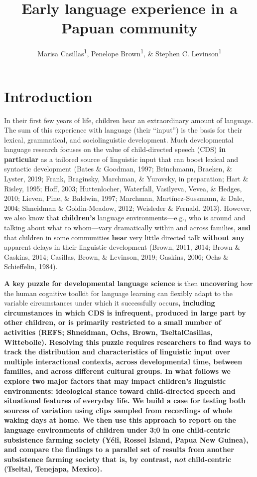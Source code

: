 \documentclass[,man,floatsintext]{apa6}
\title{Early language experience in a Papuan community}
\author{Marisa Casillas\textsuperscript{1}, Penelope Brown\textsuperscript{1},
\& Stephen C. Levinson\textsuperscript{1}}
\date{}
\affiliation{
\vspace{0.5cm}
\textsuperscript{1} Max Planck Institute for Psycholinguistics}
\begin{document}
\maketitle

\section{Introduction}\label{intro}

In their first few years of life, children hear an extraordinary amount
of language. The sum of this experience with language (their
\enquote{input}) is the basis for their lexical, grammatical, and
sociolinguistic development. Much developmental language research
focuses on the value of child-directed speech (CDS) \textbf{in
particular} as a tailored source of linguistic input that can boost
lexical and syntactic development (Bates \& Goodman, 1997; Brinchmann,
Braeken, \& Lyster, 2019; Frank, Braginsky, Marchman, \& Yurovsky, in
preparation; Hart \& Risley, 1995; Hoff, 2003; Huttenlocher, Waterfall,
Vasilyeva, Vevea, \& Hedges, 2010; Lieven, Pine, \& Baldwin, 1997;
Marchman, Martínez-Sussmann, \& Dale, 2004; Shneidman \& Goldin-Meadow,
2012; Weisleder \& Fernald, 2013). However, we also know that
\textbf{children's} language environments---e.g., who is around and
talking about what to whom---vary dramatically within and across
families, \textbf{and} that children in some communities \textbf{hear}
very little directed talk \textbf{without any} apparent delays in their
linguistic development (Brown, 2011, 2014; Brown \& Gaskins, 2014;
Casillas, Brown, \& Levinson, 2019; Gaskins, 2006; Ochs \& Schieffelin,
1984).

\textbf{A key puzzle for developmental language science} is then
\textbf{uncovering} how the human cognitive toolkit for language
learning can flexibly adapt to the variable circumstances under which it
successfully occurs\textbf{, including circumstances in which CDS is
infrequent, produced in large part by other children, or is primarily
restricted to a small number of activities (REFS; Shneidman, Ochs,
Brown, TseltalCasillas, Wittebolle). Resolving this puzzle requires
researchers to find ways to track the distribution and characteristics
of linguistic input over multiple interactional contexts, across
developmental time, between families, and across different cultural
groups. In what follows we explore two major factors that may impact
children's linguistic environments: ideological stance toward
child-directed speech and situational features of everyday life. We
build a case for testing both sources of variation using clips sampled
from recordings of whole waking days at home. We then use this approach
to report on the language environments of children under 3;0 in one
child-centric subsistence farming society (Yélî, Rossel Island, Papua
New Guinea), and compare the findings to a parallel set of results from
another subsistence farming society that is, by contrast, \emph{not}
child-centric (Tseltal, Tenejapa, Mexico).}
\end{document}

